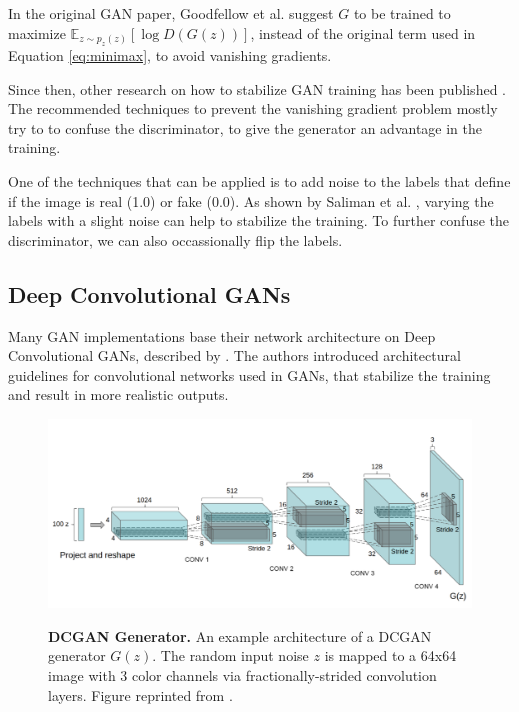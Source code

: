 \documentclass[12pt]{report}
\begin{document}
In the original GAN paper, Goodfellow et al. \cite{goodfellow_generative_2014} suggest $G$ to be trained to maximize $\mathbb{E}_{z \sim p_{z}(z)}[\log D(G(z))]$, instead of the original term used in Equation \ref{eq:minimax}, to avoid vanishing gradients. 

Since then, other research on how to stabilize GAN training has been published \cite{arjovsky_towards_2017}\cite{roth_stabilizing_2017}\cite{salimans_improved_2016}. The recommended techniques to prevent the vanishing gradient problem mostly try to to confuse the discriminator, to give the generator an advantage in the training. 

One of the techniques that can be applied is to add noise to the labels that define if the image is real (1.0) or fake (0.0). As shown by Saliman et al. \cite{salimans_improved_2016}, varying the labels with a slight noise can help to stabilize the training. To further confuse the discriminator, we can also occassionally flip the labels. 

\subsection{Deep Convolutional GANs} \label{sec:dcgan}


Many GAN implementations base their network architecture on Deep Convolutional GANs, described by \cite{radford_unsupervised_2015}. The authors introduced architectural guidelines for convolutional networks used in GANs, that stabilize the training and result in more realistic outputs.

\begin{figure}[h]
\centering
{\includegraphics[width=\linewidth]{02_background/dcgan_generator}}
\caption{\label{fig:dcgan} \textbf{DCGAN Generator.} An example architecture of a DCGAN generator $G(z)$. The random input noise $z$ is mapped to a 64x64 image with 3 color channels via fractionally-strided convolution layers. Figure reprinted from \cite{radford_unsupervised_2015}.}
\end{figure}
\end{document}
